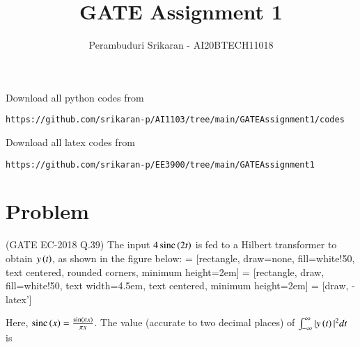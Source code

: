 \documentclass[journal,12pt,twocolumn]{IEEEtran}
\DeclareMathOperator{\sinc}{sinc}
\begin{document}
\makeatletter
{}
\makeatother
\let\StandardTheFigure\thefigure
\let\vec\mathbf
\renewcommand{\thefigure}{\theproblem}
\def\putbox#1#2#3{\makebox[0in][l]{\makebox[#1][l]{}\raisebox{\baselineskip}[0in][0in]{\raisebox{#2}[0in][0in]{#3}}}}
     \def\rightbox#1{\makebox[0in][r]{#1}}
     \def\centbox#1{\makebox[0in]{#1}}
     \def\topbox#1{\raisebox{-\baselineskip}[0in][0in]{#1}}
     \def\midbox#1{\raisebox{-0.5\baselineskip}[0in][0in]{#1}}
\vspace{3cm}
\title{GATE Assignment 1}
\author{Perambuduri Srikaran - AI20BTECH11018}
\maketitle
\newpage
\bigskip
\renewcommand{\thefigure}{\theenumi}
\renewcommand{\thetable}{\theenumi}
Download all python codes from
\begin{lstlisting}
https://github.com/srikaran-p/AI1103/tree/main/GATEAssignment1/codes
\end{lstlisting}
Download all latex codes from 
\begin{lstlisting}
https://github.com/srikaran-p/EE3900/tree/main/GATEAssignment1
\end{lstlisting}
\section*{Problem}
(GATE EC-2018 Q.39) The input $4\sinc{\brak{2t}}$ is fed to a Hilbert transformer to obtain $y\left(t\right)$, as shown in the figure below:
 = [rectangle, draw=none, fill=white!50,   
    text centered, rounded corners, minimum height=2em]
 = [rectangle, draw, fill=white!50,   
    text width=4.5em, text centered, minimum height=2em]
 = [draw, -latex']
\begin{center}
\end{center}
Here, $\sinc{\brak{x}} = \frac{\sin\brak{\pi x}}{\pi x}$. The value (accurate to two decimal places) of $\int_{-\infty}^{\infty} |y\left(t\right)|^2 dt$ is
\end{document}

